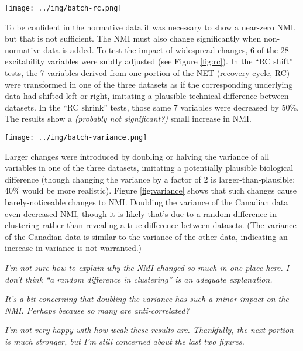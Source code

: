 \documentclass[12pt]{article}
\begin{document}
\pagebreak

\begin{figure*}
  \centering
       \texttt{[image: ../img/batch-rc.png]}
         \caption{}
  \label{fig:rc}
\end{figure*}

To be confident in the normative data it was necessary to show a near-zero NMI, but that is not sufficient. The NMI must also change significantly when non-normative data is added. To test the impact of widespread changes, 6 of the 28 excitability variables were subtly adjusted (see Figure \ref{fig:rc}). In the ``RC shift'' tests, the 7 variables derived from one portion of the NET (recovery cycle, RC) were transformed in one of the three datasets as if the corresponding underlying data had shifted left or right, imitating a plausible technical difference between datasets. In the ``RC shrink'' tests, those same 7 variables were decreased by 50\%. The results show a \emph{(probably not significant?)} small increase in NMI.

\pagebreak

\begin{figure*}
  \centering
       \texttt{[image: ../img/batch-variance.png]}
         \caption{}
  \label{fig:variance}
\end{figure*}

Larger changes were introduced by doubling or halving the variance of all variables in one of the three datasets, imitating a potentially plausible biological difference (though changing the variance by a factor of 2 is larger-than-plausible; 40\% would be more realistic). Figure \ref{fig:variance} shows that such changes cause barely-noticeable changes to NMI. Doubling the variance of the Canadian data even decreased NMI, though it is likely that's due to a random difference in clustering rather than revealing a true difference between datasets. (The variance of the Canadian data is similar to the variance of the other data, indicating an increase in variance is not warranted.)

\emph{I'm not sure how to explain why the NMI changed so much in one place here. I don't think ``a random difference in clustering'' is an adequate explanation.}

\emph{It's a bit concerning that doubling the variance has such a minor impact on the NMI. Perhaps because so many are anti-correlated?}

\emph{I'm not very happy with how weak these results are. Thankfully, the next portion is much stronger, but I'm still concerned about the last two figures.}
\end{document}
